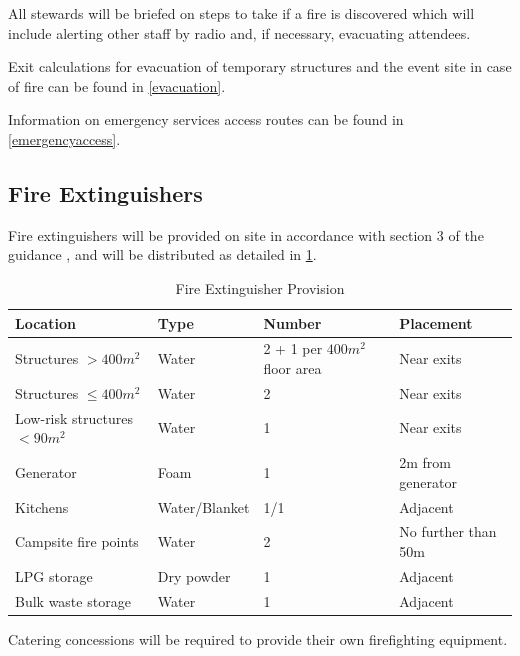 All stewards will be briefed on steps to take if a fire is discovered which
will include alerting other staff by radio and, if necessary, evacuating
attendees.

Exit calculations for evacuation of temporary structures and the event site in case of
fire can be found in \cref{evacuation}.

Information on emergency services access routes can be found in \cref{emergencyaccess}.

\subsection{Fire Extinguishers}
\label{fire-extinguishers}

Fire extinguishers will be provided on site in accordance with section 3 of the
guidance \cite{firesafety}, and will be distributed as detailed in \cref{table:fireex}.

\begin{table}[h!]
\caption{Fire Extinguisher Provision}
\label{table:fireex}
\centering
\begin{tabular}{| l | l | l | l |}
\hline
    \textbf{Location}            & \textbf{Type} & \textbf{Number} & \textbf{Placement} \\
    \hline
    Structures $>400m^2$         & Water         & 2 + 1 per $400m^2$ floor area & Near exits \\
    Structures $\leq400m^2$      & Water         & 2                          & Near exits \\
    Low-risk structures $<90m^2$ & Water         & 1                          & Near exits \\
    Generator                    & Foam          & 1                          & 2m from generator \\
    Kitchens                     & Water/Blanket & 1/1                        & Adjacent \\
    Campsite fire points         & Water         & 2                          & No further than 50m \\
    LPG storage                  & Dry powder    & 1                          & Adjacent \\
    Bulk waste storage           & Water         & 1                          & Adjacent \\
\hline
\end{tabular}
\end{table}

Catering concessions will be required to provide their own firefighting equipment.


